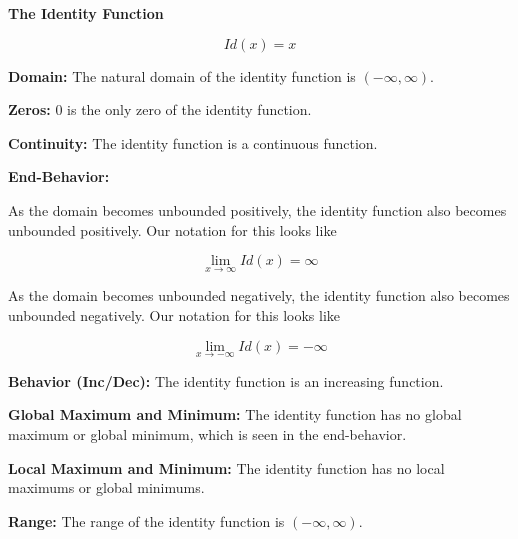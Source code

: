 \documentclass{ximera}
\begin{document}
\begin{explanation} \textbf{\textcolor{red!75!green}{The Identity Function}} 


\[ Id(x) = x  \]



\textbf{Domain:} The natural domain of the identity function is $(-\infty, \infty)$.

\textbf{Zeros:} $0$ is the only zero of the identity function.

\textbf{Continuity:} The identity function is a continuous function.

\textbf{End-Behavior:} 

As the domain becomes unbounded positively, the identity function also becomes unbounded positively.  Our notation for this looks like

\[
\lim\limits_{x \to \infty} Id(x) = \infty
\]

As the domain becomes unbounded negatively, the identity function also becomes unbounded negatively.  Our notation for this looks like

\[
\lim\limits_{x \to -\infty} Id(x) = -\infty
\]




\textbf{Behavior (Inc/Dec):} The identity function is an increasing function.

\textbf{Global Maximum and Minimum:} The identity function has no global maximum or global minimum, which is seen in the end-behavior.




\textbf{Local Maximum and Minimum:} The identity function has no local maximums or global minimums. 

\textbf{Range:} The range of the identity function is $(-\infty, \infty)$.

\end{explanation}
\end{document}
